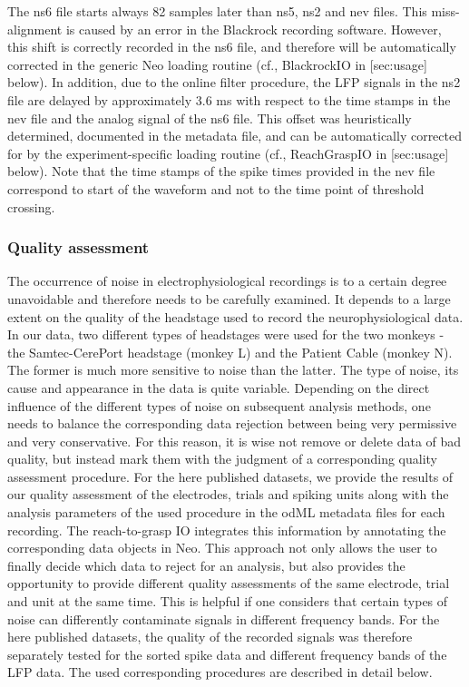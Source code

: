 {The ns6 file starts always 82 samples later than ns5, ns2 and nev files. This miss-alignment is caused by an error in the Blackrock recording software. However, this shift is correctly recorded in the ns6 file, and therefore will be automatically corrected in the generic Neo loading routine (cf., BlackrockIO in [sec:usage] below). In addition, due to the online filter procedure, the LFP signals in the ns2 file are delayed by approximately 3.6 ms with respect to the time stamps in the nev file and the analog signal of the ns6 file. This offset was heuristically determined, documented in the metadata file, and can be automatically corrected for by the experiment-specific loading routine (cf., ReachGraspIO in [sec:usage] below). Note that the time stamps of the spike times provided in the nev file correspond to start of the waveform and not to the time point of threshold crossing.

\subsubsection{Quality assessment}

The occurrence of noise in electrophysiological recordings is to a certain degree unavoidable and therefore needs to be carefully examined. It depends to a large extent on the quality of the headstage used to record the neurophysiological data. In our data, two different types of headstages were used for the two monkeys - the Samtec-CerePort headstage (monkey L) and the Patient Cable (monkey N). The former is much more sensitive to noise than the latter. The type of noise, its cause and appearance in the data is quite variable. Depending on the direct influence of the different types of noise on subsequent analysis methods, one needs to balance the corresponding data rejection between being very permissive and very conservative. For this reason, it is wise not remove or delete data of bad quality, but instead mark them with the judgment of a corresponding quality assessment procedure. For the here published datasets, we provide the results of our quality assessment of the electrodes, trials and spiking units along with the analysis parameters of the used procedure in the odML metadata files for each recording. The reach-to-grasp IO integrates this information by annotating the corresponding data objects in Neo. This approach not only allows the user to finally decide which data to reject for an analysis, but also provides the opportunity to provide different quality assessments of the same electrode, trial and unit at the same time. This is helpful if one considers that certain types of noise can differently contaminate signals in different frequency bands. For the here published datasets, the quality of the recorded signals was therefore separately tested for the sorted spike data and different frequency bands of the LFP data. The used corresponding procedures are described in detail below. 

}
